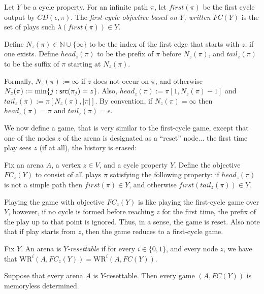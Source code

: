 \documentclass[a4paper,10pt]{article}
\newcommand{\WR}{\textrm{WR}}
\begin{document}
\begin{definition}
Let $Y$ be a cycle property. For an infinite path $\pi$, let $first(\pi)$ be the first cycle output by $CD(\epsilon,\pi)$.
The \emph{first-cycle objective based on $Y$, written $FC(Y)$} is the set of plays such $\lambda(first(\pi)) \in Y$.
\end{definition}

Define $N_z(\pi) \in \mathbb{N} \cup \{\infty\}$ to be the index of the first edge that starts with $z$, if one exists.  Define $head_z(\pi)$ to be the prefix of $\pi$ before $N_z(\pi)$, and 
$tail_z(\pi)$ to be the suffix of $\pi$ starting at $N_z(\pi)$. 

Formally, $N_z(\pi):= \infty$ if $z$ does not occur on $\pi$, and otherwise $N_z(\pi) := \min\{j : \textsf{src}(\pi_j) = z\}$. Also, 
$head_z(\pi) := \pi[1,N_z(\pi)-1]$ and $tail_z(\pi) := \pi[N_z(\pi), |\pi|]$. 
By convention, if $N_z(\pi) = \infty$ then $head_z(\pi) = \pi$ and $tail_z(\pi) = \epsilon$.

We now define a game, that is very similar to the first-cycle game, except that one of the nodes $z$ of the arena is designated as a ``reset'' node... the first time play sees $z$ (if at all), the history is erased:
\begin{definition}
Fix an arena $A$, a vertex $z \in V$, and a cycle property $Y$. Define the objective $FC_z(Y)$ to consist of all plays $\pi$ satisfying the following property: if $head_z(\pi)$ is not a simple path then $first(\pi) \in Y$, and otherwise $first(tail_z(\pi)) \in Y$.
\end{definition}

Playing the game with objective $FC_z(Y)$ is like playing the first-cycle game over $Y$, however, if no cycle is formed before reaching $z$ for the first time, the prefix of the play up to that point is ignored. Thus, in a sense, the game is reset. Also note that if play starts from $z$, then the game reduces to a first-cycle game.


\begin{definition}
Fix $Y$.
An arena is {\em $Y$-resettable} if for every $i \in \{0,1\}$, and every node $z$, we have that
$\WR^i(A,FC_z(Y)) = \WR^i(A,FC(Y))$.
\end{definition}

\begin{theorem}  \label{EM}
Suppose that every arena $A$ is $Y$-resettable. Then every 
game $(A,FC(Y))$ is memoryless determined.
\end{theorem}
\end{document}
